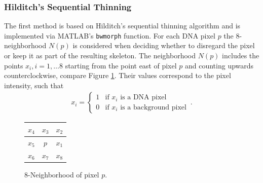 \documentclass{article}
\begin{document}
\subsubsection{Hilditch's Sequential Thinning}\label{sec:Hilditch's Sequential Thinning}
The first method is based on Hilditch's sequential thinning algorithm   \cite{lam1992thinning} and is implemented via MATLAB's \verb|bwmorph| function. For each DNA pixel $p$ the 8-neighborhood $N(p)$ is considered when deciding whether to disregard the pixel or keep it as part of the resulting skeleton. The neighborhood $N(p)$ includes the points $x_i, i= 1,\dots 8$ starting from the point east of pixel $p$ and counting upwards counterclockwise, compare Figure \ref{tab: neighborhood}. Their values correspond to the pixel intensity, such that
\begin{align*}
x_i = \begin{cases}
1 & \text{if } x_i \text{ is a DNA pixel}\\
0 & \text{if }x_i \text{ is a background pixel}
\end{cases}\, .
\end{align*}

\begin{figure}[htb]
\centering
\renewcommand{\arraystretch}{2}
\begin{tabular}{|c|c|c|}\hline
$x_4$ & $x_3$ & $x_2$ \\\hline
$x_5$ & $p$ & $x_1$ \\\hline
$x_6$ & $x_7$ & $x_8$\\\hline
\end{tabular}
\caption{8-Neighborhood of pixel $p$.}\label{tab: neighborhood}
\end{figure}
\end{document}

